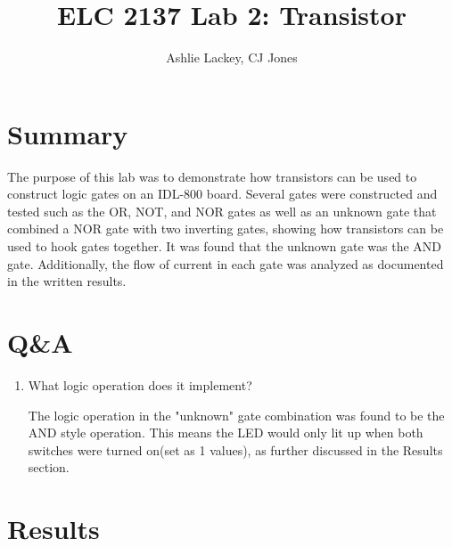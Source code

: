 \documentclass[11pt]{article}
\begin{document}
\title{ELC 2137 Lab 2: Transistor}
\author{Ashlie Lackey, CJ Jones}

\maketitle


\section*{Summary}

The purpose of this lab was to demonstrate how transistors can be used to construct logic gates on an IDL-800 board. Several gates were constructed and tested such as the OR, NOT, and NOR gates as well as an unknown gate that combined a NOR gate with two inverting gates, showing how transistors can be used to hook gates together. It was found that the unknown gate was the AND gate. Additionally, the flow of current in each gate was analyzed as documented in the written results.


\section*{Q\&A}

\begin{enumerate}
	\item What logic operation does it implement?
	
	The logic operation in the "unknown" gate combination was found to be the AND style operation. This means the LED would only lit up when both switches were turned on(set as 1 values), as further discussed in the Results section.
\end{enumerate}



\section*{Results}
\end{document}
